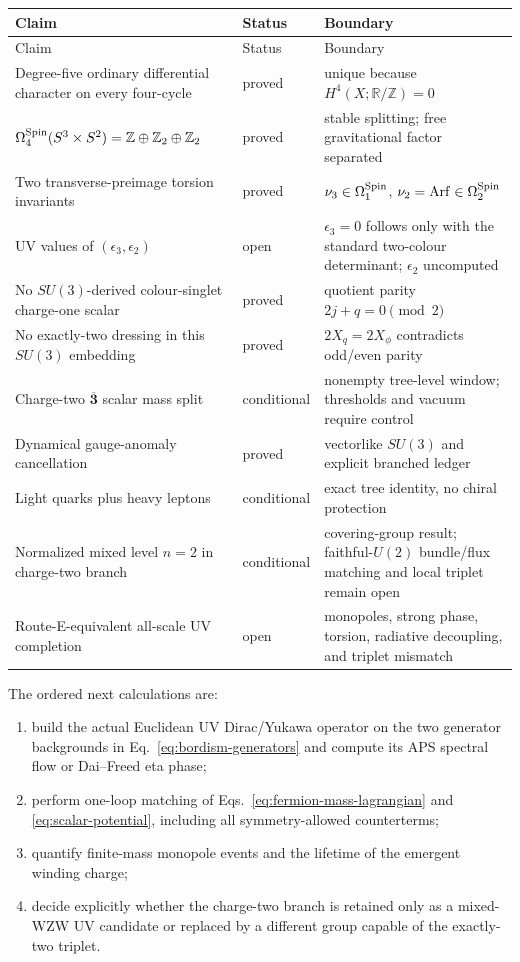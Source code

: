 \documentclass[11pt]{article}
\theoremstyle{definition}
\theoremstyle{remark}
\newcommand{\ZZ}{\mathbb Z}
\newcommand{\RR}{\mathbb R}
\newcommand{\Arf}{\operatorname{Arf}}
\newcommand{\status}[1]{\textcolor{blue!60!black}{\textsf{#1}}}
\begin{document}
\begin{longtable}{@{}L{0.42\textwidth}L{0.16\textwidth}L{0.32\textwidth}@{}}
\toprule
Claim & Status & Boundary\\
\midrule
\endfirsthead
\toprule
Claim & Status & Boundary\\
\midrule
\endhead
Degree-five ordinary differential character on every four-cycle &
\status{proved} & unique because \(H^4(X;\RR/\ZZ)=0\)\\
\(\Omega_4^{\rm Spin}(S^3\times S^2)=\ZZ\oplus\ZZ_2\oplus\ZZ_2\) &
\status{proved} & stable splitting; free gravitational factor separated\\
Two transverse-preimage torsion invariants & \status{proved} &
\(\nu_3\in\Omega_1^{\rm Spin}\),
\(\nu_2=\Arf\in\Omega_2^{\rm Spin}\)\\
UV values of \((\epsilon_3,\epsilon_2)\) & \status{open} &
\(\epsilon_3=0\) follows only with the standard two-colour determinant;
\(\epsilon_2\) uncomputed\\
No \(SU(3)\)-derived colour-singlet charge-one scalar & \status{proved} &
quotient parity \(2j+q=0\pmod2\)\\
No exactly-two dressing in this \(SU(3)\) embedding & \status{proved} &
\(2X_q=2X_\phi\) contradicts odd/even parity\\
Charge-two \(\overline{\bm3}\) scalar mass split & \status{conditional} &
nonempty tree-level window; thresholds and vacuum require control\\
Dynamical gauge-anomaly cancellation & \status{proved} & vectorlike
\(SU(3)\) and explicit branched ledger\\
Light quarks plus heavy leptons & \status{conditional} & exact tree identity,
no chiral protection\\
Normalized mixed level \(n=2\) in charge-two branch & \status{conditional} &
covering-group result; faithful-\(U(2)\) bundle/flux matching and local
triplet remain open\\
Route-E-equivalent all-scale UV completion & \status{open} & monopoles,
strong phase, torsion, radiative decoupling, and triplet mismatch\\
\bottomrule
\end{longtable}

The ordered next calculations are:
\begin{enumerate}
\item build the actual Euclidean UV Dirac/Yukawa operator on the two generator
  backgrounds in Eq.~\eqref{eq:bordism-generators} and compute its APS
  spectral flow or Dai--Freed eta phase;
\item perform one-loop matching of Eqs.~\eqref{eq:fermion-mass-lagrangian} and
  \eqref{eq:scalar-potential}, including all symmetry-allowed counterterms;
\item quantify finite-mass monopole events and the lifetime of the emergent
  winding charge;
\item decide explicitly whether the charge-two branch is retained only as a
  mixed-WZW UV candidate or replaced by a different group capable of the
  exactly-two triplet.
\end{enumerate}



\end{document}
